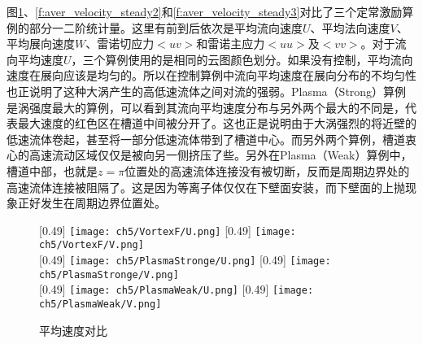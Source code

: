 图\ref{f:aver_velocity_steady1}、\ref{f:aver_velocity_steady2}和\ref{f:aver_velocity_steady3}对比了三个定常激励算例的部分一二阶统计量。这里有前到后依次是平均流向速度$U$、平均法向速度$V$、平均展向速度$W$、雷诺切应力$<uv>$和雷诺主应力$<uu>$及$<vv>$。对于流向平均速度$U$，三个算例使用的是相同的云图颜色划分。如果没有控制，平均流向速度在展向应该是均匀的。所以在控制算例中流向平均速度在展向分布的不均匀性也正说明了这种大涡产生的高低速流体之间对流的强弱。Plasma（Strong）算例是涡强度最大的算例，可以看到其流向平均速度分布与另外两个最大的不同是，代表最大速度的红色区在槽道中间被分开了。这也正是说明由于大涡强烈的将近壁的低速流体卷起，甚至将一部分低速流体带到了槽道中心。而另外两个算例，槽道衷心的高速流动区域仅仅是被向另一侧挤压了些。另外在Plasma（Weak）算例中，槽道中部，也就是$z=\pi$位置处的高速流体连接没有被切断，反而是周期边界处的高速流体连接被阻隔了。这是因为等离子体仅仅在下壁面安装，而下壁面的上抛现象正好发生在周期边界位置处。
\begin{figure}[htb]
  \centering
  [0.49\textwidth]
    {\texttt{[image: ch5/VortexF/U.png]}}
  [0.49\textwidth]
    {\texttt{[image: ch5/VortexF/V.png]}}
  \\\bigskip
  [0.49\textwidth]
    {\texttt{[image: ch5/PlasmaStronge/U.png]}}
  [0.49\textwidth]
    {\texttt{[image: ch5/PlasmaStronge/V.png]}}
  \\\bigskip
  [0.49\textwidth]
    {\texttt{[image: ch5/PlasmaWeak/U.png]}}
  [0.49\textwidth]
    {\texttt{[image: ch5/PlasmaWeak/V.png]}}
  \caption{平均速度对比}\label{f:aver_velocity_steady1}
\end{figure}

